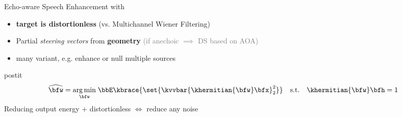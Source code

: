 \begin{frame}[t]{Echo-aware Speech Enhancement with \dechorate}
    \pause
    \begin{itemize}
        \small
        \item \textbf{target is distortionless} (vs. Multichannel Wiener Filtering)
        \item Partial \textit{steering vectors} from \textbf{geometry} \hspace{1em}\textcolor{gray}{\small(if anechoic $\implies$ DS based on AOA)}
        \item many variant, e.g. enhance or null multiple sources~\cite{gannot2017consolidated}
    \end{itemize}

    \pause
    \vfill
    \vspace*{.25em}
    \begin{beamercolorbox}[sep=.5em]{postit}
        \centering
        \begin{equation*}
            \widehat{\bfw} = \underset{\bfw}{\arg\min} \;
            \bbE\kbrace{\set{ \kvvbar{\khermitian{\bfw} \bfx }_2^2}}
            \quad\text{s.t.}\quad\khermitian{\bfw}\bfh = 1
        \end{equation*}
        \textcolor{myred}{\small Reducing output energy + distortionless $\Leftrightarrow$ reduce any noise}
    \end{beamercolorbox}




\end{frame}

